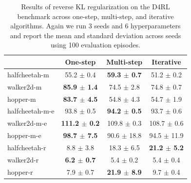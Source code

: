 \begin{table}[h]
\vspace{-0.5 cm}
    \centering
    \caption{Results of reverse KL regularization on the D4RL benchmark across one-step, multi-step, and iterative algorithms. Again we run 3 seeds and 6 hyperparameters and report the mean and standard deviation across seeds using 100 evaluation episodes.}
    \begin{small}
    \begin{tabular}{lccc}
        \toprule
         & One-step & Multi-step & Iterative \\
        \midrule
        halfcheetah-m &
                        55.2  $\pm$  0.4  &
                        \textbf{59.3  $\pm$  0.7} &
                        51.2  $\pm$  0.2\\
        walker2d-m &
                        \textbf{85.9  $\pm$  1.4} &
                        74.5  $\pm$  2.8    &
                        74.8  $\pm$  0.7  \\
        hopper-m &
                        \textbf{83.7  $\pm$  4.5} &
                        54.8  $\pm$  4.3  &
                        54.7  $\pm$  1.9\\
        \midrule
        halfcheetah-m-e &
                        93.8  $\pm$  0.5 &
                        \textbf{94.2  $\pm$  0.5} &
                        93.7  $\pm$  0.6 \\
        walker2d-m-e &
                        \textbf{111.2  $\pm$  0.2} &
                        109.8  $\pm$  0.3  &
                        108.7  $\pm$  0.6 \\
        hopper-m-e &
                        \textbf{98.7  $\pm$  7.5} &
                        90.6  $\pm$  18.8 &
                        94.5  $\pm$  11.9\\
        \midrule
        halfcheetah-r &
                        8.8  $\pm$  3.8  &
                        18.3  $\pm$  6.5 &
                        \textbf{21.2  $\pm$  5.2}\\
        walker2d-r &
                        \textbf{6.2  $\pm$  0.7} &
                        5.4  $\pm$  0.2 &
                        5.4  $\pm$  0.4\\
        hopper-r &
                        7.9  $\pm$  0.7 &
                        \textbf{21.9  $\pm$  8.9} &
                        9.7  $\pm$  0.4\\
        \bottomrule
    \end{tabular}
    \end{small}
    \label{tab:multi}
\end{table}

